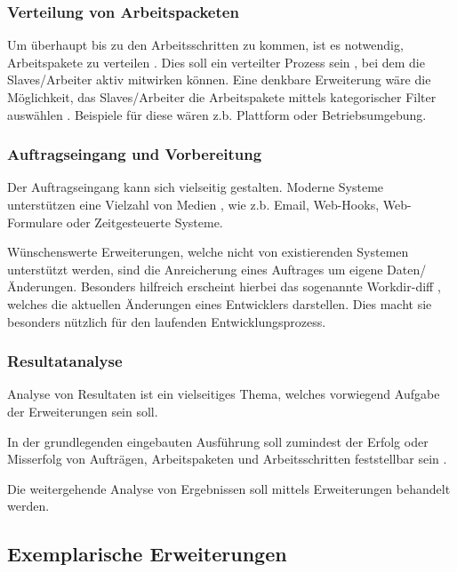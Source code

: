 \subsubsection{Verteilung von Arbeitspacketen}

Um \"uberhaupt bis zu den Arbeitsschritten zu kommen,
ist es notwendig, Arbeitspakete zu verteilen .
Dies soll ein verteilter Prozess sein ,
bei dem die Slaves/Arbeiter aktiv mitwirken k\"onnen.
Eine denkbare Erweiterung w\"are die Möglichkeit, das Slaves/Arbeiter
die Arbeitspakete mittels kategorischer Filter auswählen .
Beispiele f\"ur diese w\"aren z.b. Plattform oder Betriebsumgebung.

\subsubsection{Auftragseingang und Vorbereitung}


Der Auftragseingang kann sich vielseitig gestalten.
Moderne Systeme unterstützen eine Vielzahl von Medien ,
wie z.b. Email, Web-Hooks, Web-Formulare oder Zeitgesteuerte Systeme.

W\"unschenswerte Erweiterungen, welche nicht von existierenden Systemen unterst\"utzt werden,
sind die Anreicherung eines Auftrages um eigene Daten/\"Anderungen.
Besonders hilfreich erscheint hierbei das sogenannte Workdir-diff ,
welches die aktuellen \"Anderungen eines Entwicklers darstellen.
Dies macht sie besonders n\"utzlich f\"ur den laufenden Entwicklungsprozess.

\subsubsection{Resultatanalyse}

Analyse von Resultaten ist ein vielseitiges Thema,
welches vorwiegend Aufgabe der Erweiterungen sein soll.

In der grundlegenden eingebauten Ausf\"uhrung soll zumindest der Erfolg oder Misserfolg
von Auftr\"agen, Arbeitspaketen und Arbeitsschritten feststellbar sein .

Die weitergehende Analyse von Ergebnissen soll mittels Erweiterungen behandelt werden.

\subsection{Exemplarische Erweiterungen}

